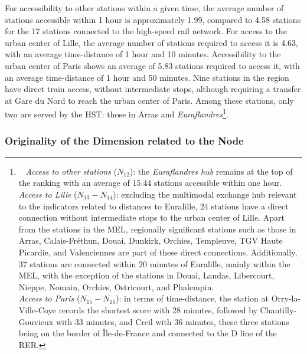 \begin{refsegment}
For accessibility to other stations within a given time, the average number of stations accessible within 1 hour is approximately 1.99, compared to 4.58 stations for the 17 stations connected to the high-speed rail network. For access to the urban center of Lille, the average number of stations required to access it is 4.63, with an average time-distance of 1 hour and 10 minutes. Accessibility to the urban center of Paris shows an average of 5.83 stations required to access it, with an average time-distance of 1 hour and 50 minutes. Nine stations in the region have direct train access, without intermediate stops, although requiring a transfer at Gare du Nord to reach the urban center of Paris. Among these stations, only two are served by the \acrshort{HST}: those in Arras and \textsl{Euraflandres}\footnote{~
    \textsl{Access to other stations} (\(N_{12}\)): the \textsl{Euraflandres hub} remains at the top of the ranking with an average of 15.44 stations accessible within one hour.
    \\
    \textsl{Access to Lille} (\(N_{13} - N_{14}\)): excluding the multimodal exchange hub relevant to the indicators related to distances to Euralille, 24 stations have a direct connection without intermediate stops to the urban center of Lille. Apart from the stations in the \acrfull{MEL}, regionally significant stations such as those in Arras, Calais-Fréthun, Douai, Dunkirk, Orchies, Templeuve, TGV Haute Picardie, and Valenciennes are part of these direct connections. Additionally, 37 stations are connected within 20 minutes of Euralille, mainly within the \acrshort{MEL}, with the exception of the stations in Douai, Landas, Libercourt, Nieppe, Nomain, Orchies, Ostricourt, and Phalempin.
    \\
    \textsl{Access to Paris} (\(N_{15} - N_{16}\)): in terms of time-distance, the station at Orry-la-Ville-Coye records the shortest score with 28 minutes, followed by Chantilly-Gouvieux with 33 minutes, and Creil with 36 minutes, these three stations being on the border of Île-de-France and connected to the D line of the \acrfull{RER}.
}.%

\subsubsection*{Originality of the Dimension related to the Node
    \label{chap6:indicateurs-node-originalite}
    }


\end{refsegment}
